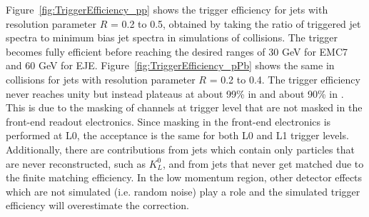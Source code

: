 Figure~\ref{fig:TriggerEfficiency_pp} shows the trigger efficiency for jets with resolution parameter $R$ = 0.2 to 0.5, obtained by taking the ratio of triggered jet spectra to minimum bias jet spectra in simulations of \pp collisions. The trigger becomes fully efficient before reaching the desired ranges of 30 GeV for EMC7 and 60 GeV for EJE. Figure~\ref{fig:TriggerEfficiency_pPb} shows the same in \pPb collisions for jets with resolution parameter $R$ = 0.2 to 0.4. The trigger efficiency never reaches unity but instead plateaus at about 99\% in \pp and about 90\% in \pPb. This is due to the masking of channels at trigger level that are not masked in the front-end readout electronics. Since masking in the front-end electronics is performed at L0, the acceptance is the same for both L0 and L1 trigger levels. Additionally, there are contributions from jets which contain only particles that are never reconstructed, such as $K_L^0$, and from jets that never get matched due to the finite matching efficiency. In the low momentum region, other detector effects which are not simulated (i.e. random noise) play a role and the simulated trigger efficiency will overestimate the correction.


